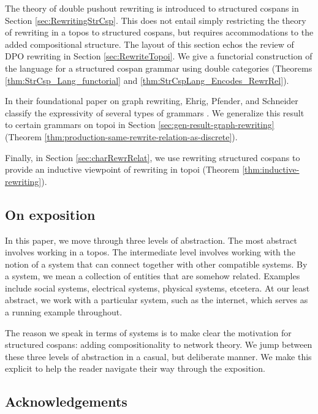 \documentclass{amsart}
\begin{document}
The theory of double pushout rewriting is
introduced to structured cospans in Section
\ref{sec:RewritingStrCsp}. This does not entail
simply restricting the theory of rewriting in a
topos to structured cospans, but requires
accommodations to the added compositional
structure. The layout of this section echos the
review of DPO rewriting in Section
\ref{sec:RewriteTopoi}. We give a functorial
construction of the language for a structured
cospan grammar using double categories (Theorems
\ref{thm:StrCsp_Lang_functorial} and
\ref{thm:StrCspLang_Encodes_RewrRel}).

In their foundational paper on graph rewriting,
Ehrig, Pfender, and Schneider classify the expressivity of
several types of grammars
\cite[Prop.~3.3]{Ehrig_GraphGram}. We generalize
this result to certain grammars on topoi in
Section \ref{sec:gen-result-graph-rewriting}
(Theorem
\ref{thm:production-same-rewrite-relation-as-discrete}).

Finally, in Section \ref{sec:charRewrRelat}, we
use rewriting structured cospans to provide an
inductive viewpoint of rewriting in topoi (Theorem
\ref{thm:inductive-rewriting}). 

\subsection{On exposition}
\label{sec:word-about-expos}

In this paper, we move through three levels of
abstraction. The most abstract involves working
in a topos.  The intermediate level
involves working with the notion of a system
that can connect together with other compatible
systems. By a system, we mean a collection of
entities that are somehow related. Examples
include social systems, electrical systems,
physical systems, etcetera.  At our least
abstract, we work with a particular system, such
as the internet, which serves as a running example
throughout.

The reason we speak in terms of systems is to
make clear the motivation for structured cospans:
adding compositionality to network theory.  We
jump between these three levels of abstraction in
a casual, but deliberate manner.  We make this
explicit to help the reader navigate their way
through the exposition.  

\subsection{Acknowledgements}
\label{sec:acknowledgements}
\end{document}
